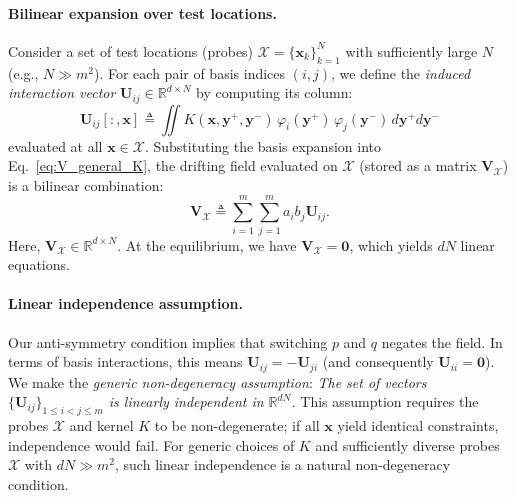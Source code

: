 \paragraph{Bilinear expansion over test locations.}
Consider a set of test locations (probes) $\mathcal{X} = \{\mathbf{x}_k\}_{k=1}^N$ with sufficiently large $N$ (e.g., $N \gg m^2$).
For each pair of basis indices $(i,j)$, we define the \emph{induced interaction vector} $\mathbf{U}_{ij} \in \mathbb{R}^{d{\times}N}$ by computing its column:
\begin{equation}
\mathbf{U}_{ij}[:, \mathbf{x}] \triangleq \iint K(\mathbf{x},\mathbf{y}^+,\mathbf{y}^-)\, \varphi_i(\mathbf{y}^+)\,\varphi_j(\mathbf{y}^-)\,d\mathbf{y}^+d\mathbf{y}^-
\end{equation}
evaluated at all $\mathbf{x} \in \mathcal{X}$.
Substituting the basis expansion into Eq.~\eqref{eq:V_general_K}, the drifting field evaluated on $\mathcal{X}$ (stored as a matrix $\mathbf{V}_{\mathcal{X}}$) is a bilinear combination:
\begin{equation}
\mathbf{V}_{\mathcal{X}} \triangleq \sum_{i=1}^m \sum_{j=1}^m a_i b_j \mathbf{U}_{ij}.
\end{equation}
Here, $\mathbf{V}_{\mathcal{X}} \in \mathbb{R}^{d{\times}N}$. At the equilibrium, we have $\mathbf{V}_{\mathcal{X}}=\textbf{0}$, which yields $dN$ linear equations.

\paragraph{Linear independence assumption.}
Our anti-symmetry condition implies that switching $p$ and $q$ negates the field. In terms of basis interactions, this means $\mathbf{U}_{ij} = -\mathbf{U}_{ji}$ (and consequently $\mathbf{U}_{ii} = \mathbf{0}$).
We make the \emph{generic non-degeneracy assumption}:
\textit{The set of vectors $\{\mathbf{U}_{ij}\}_{1 \le i < j \le m}$ is linearly independent in $\mathbb{R}^{dN}$.}
This assumption requires the probes $\mathcal{X}$ and kernel $K$ to be non-degenerate; if all $\mathbf{x}$ yield identical constraints, independence would fail. For generic choices of $K$ and sufficiently diverse probes $\mathcal{X}$ with $dN\gg m^2$, such linear independence is a natural non-degeneracy condition.


